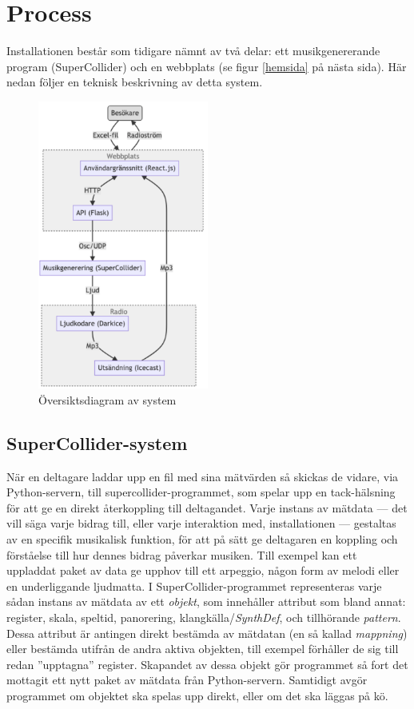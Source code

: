\documentclass[11pt, a4paper]{article} %
\begin{document}
\section*{Process}
Installationen består som tidigare nämnt av två delar: ett musikgenererande program (SuperCollider) och en webbplats (se figur \ref{hemsida} på nästa sida). Här nedan följer en teknisk beskrivning av detta system.

\begin{figure}[H]
\centering
\includegraphics[width=0.5\textwidth]{../media/flowchart.png}
\caption{Översiktsdiagram av system}
\end{figure}


\subsection*{SuperCollider-system}
När en deltagare laddar upp en fil med sina mätvärden så skickas de vidare, via Python-servern, till \gls{supercollider}-programmet, som spelar upp en tack-hälsning för att ge en direkt återkoppling till deltagandet. Varje instans av mätdata --- det vill säga varje bidrag till, eller varje interaktion med, installationen --- gestaltas av en specifik musikalisk funktion, för att på sätt ge deltagaren en koppling och förståelse till hur dennes bidrag påverkar musiken. Till exempel kan ett uppladdat paket av data ge upphov till ett arpeggio, någon form av melodi eller en underliggande ljudmatta. I SuperCollider-programmet representeras varje sådan instans av mätdata av ett \emph{objekt}, som innehåller attribut som bland annat: register, skala, speltid, panorering, klangkälla/\emph{SynthDef}, och tillhörande \emph{\gls{pattern}}. Dessa attribut är antingen direkt bestämda av mätdatan (en så kallad \emph{mappning}) eller bestämda utifrån de andra aktiva objekten, till exempel förhåller de sig till redan ''upptagna'' register. Skapandet av dessa objekt gör programmet så fort det mottagit ett nytt paket av mätdata från Python-servern. Samtidigt avgör programmet om objektet ska spelas upp direkt, eller om det ska läggas på kö. 
\end{document}
